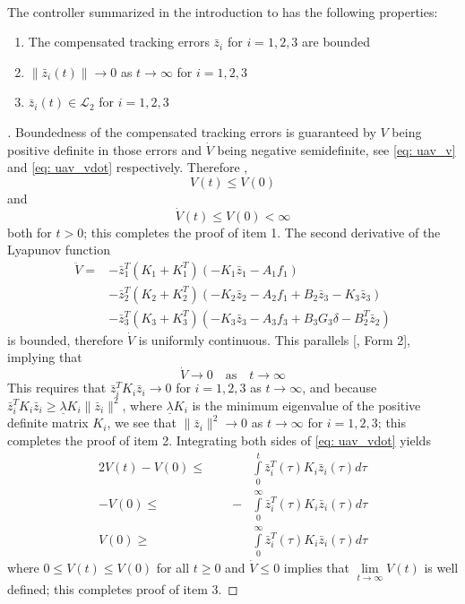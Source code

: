 \documentclass[12pt]{ucthesis}
\begin{document}
\begin{thm} \alignright \citet[Thm. 2]{Farrell2005} \label{thm: cfbs}\\
The controller summarized in the introduction to  has the following properties:
	\begin{enumerate}[labelindent=\parindent,leftmargin=.5in,noitemsep,nosep]
		\item The compensated tracking errors $\bar{z}_i$ for $i = 1, 2, 3$ are bounded
		\item $\| \bar{z}_i(t) \| \to 0$ as $t \to \infty$ for $i = 1, 2, 3$
		\item $\bar{z}_i(t) \in \mathcal{L}_2$ for $i = 1, 2, 3$
	\end{enumerate}
\end{thm}
%
\begin{proof}[]
	Boundedness of the compensated tracking errors is guaranteed by $V$ being positive definite in those errors and $\dot{V}$ being negative semidefinite, see \autoref{eq: uav_v} and \ref{eq: uav_vdot} respectively. Therefore ,
		$$ V(t) \leq V(0) $$ 
	and
		$$ \dot{V}(t) \leq V(0) < \infty $$
	both for $t > 0$; this completes the proof of item 1. The second derivative of the Lyapunov function 
		\begin{align*}
			\ddot{V} =	& -\bar{z}^T_1(K_1 + K^T_1)(-K_1 \bar{z}_1 - A_1 f_1 ) \\
						& -\bar{z}^T_2(K_2 + K^T_2)(-K_2 \bar{z}_2 - A_2 f_1 + B_2 \bar{z}_3 - K_3 \bar{z}_3 ) \\
						& -\bar{z}^T_3(K_3 + K^T_3)(-K_3 \bar{z}_3 - A_3 f_3 + B_3 G_3 \delta - B^T_2 \bar{z}_2)
		\end{align*}
	is bounded, therefore $\dot{V}$ is uniformly continuous. This parallels [, Form 2], implying that 
		$$ \dot{V} \to 0 \quad\text{as}\quad t \to \infty $$
	This requires that $\bar{z}^T_i K_i \bar{z}_i \to 0$ for $i = 1, 2, 3$ as $t \to \infty$, and because $\bar{z}^T_i K_i \bar{z}_i \geq \underline{\lambda} K_i \| \bar{z}_i \|^2$, where $\underline{\lambda} K_i$ is the minimum eigenvalue of the positive definite matrix $K_i$, we see that $\| \bar{z}_i \|^2 \to 0$ as $t \to \infty$ for $i = 1, 2, 3$; this completes the proof of item 2. Integrating both sides of \autoref{eq: uav_vdot} yields
	\begin{alignat*}{2}
		V(t) - V(0) \leq \quad&\; &\int\limits_{0}^{t} 	  \bar{z}^T_i (\tau) K_i \bar{z}_i (\tau) d\tau\\
	 		 - V(0) \leq \quad&\;-&\int\limits_{0}^{\infty} \bar{z}^T_i (\tau) K_i \bar{z}_i (\tau) d\tau\\
	 		   V(0) \geq \quad&\; &\int\limits_{0}^{\infty} \bar{z}^T_i (\tau) K_i \bar{z}_i (\tau) d\tau
	\end{alignat*}
	where $0 \leq V(t) \leq V(0)$ for all $t \geq 0$ and $\dot{V} \leq 0$ implies that $\lim\limits_{t \to \infty} V(t)$ is well defined; this completes proof of item 3.
\end{proof}
\end{document}
